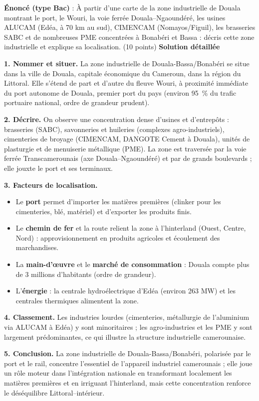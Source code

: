 \documentclass[11pt]{article}
\begin{document}
\begin{exoresolu}
\textbf{Énoncé (type Bac)} : À partir d'une carte de la zone industrielle de Douala montrant le port, le Wouri, la voie ferrée Douala--Ngaoundéré, les usines ALUCAM (Edéa, à 70 km au sud), CIMENCAM (Nomayos/Figuil), les brasseries SABC et de nombreuses PME concentrées à Bonabéri et Bassa : décris cette zone industrielle et explique sa localisation. (10 points)
\tcblower
\textbf{Solution détaillée}

\textbf{1. Nommer et situer.} La zone industrielle de Douala-Bassa/Bonabéri se situe dans la ville de Douala, capitale économique du Cameroun, dans la région du Littoral. Elle s'étend de part et d'autre du fleuve Wouri, à proximité immédiate du port autonome de Douala, premier port du pays (environ 95~\% du trafic portuaire national, ordre de grandeur prudent).

\textbf{2. Décrire.} On observe une concentration dense d'usines et d'entrepôts : brasseries (SABC), savonneries et huileries (complexes agro-industriels), cimenteries de broyage (CIMENCAM, DANGOTE Cement à Douala), unités de plasturgie et de menuiserie métallique (PME). La zone est traversée par la voie ferrée Transcamerounais (axe Douala--Ngaoundéré) et par de grands boulevards ; elle jouxte le port et ses terminaux.

\textbf{3. Facteurs de localisation.}
\begin{itemize}
\item Le \textbf{port} permet d'importer les matières premières (clinker pour les cimenteries, blé, matériel) et d'exporter les produits finis.
\item Le \textbf{chemin de fer} et la route relient la zone à l'hinterland (Ouest, Centre, Nord) : approvisionnement en produits agricoles et écoulement des marchandises.
\item La \textbf{main-d'œuvre} et le \textbf{marché de consommation} : Douala compte plus de 3 millions d'habitants (ordre de grandeur).
\item L'\textbf{énergie} : la centrale hydroélectrique d'Edéa (environ 263 MW) et les centrales thermiques alimentent la zone.
\end{itemize}

\textbf{4. Classement.} Les industries lourdes (cimenteries, métallurgie de l'aluminium via ALUCAM à Edéa) y sont minoritaires ; les agro-industries et les PME y sont largement prédominantes, ce qui illustre la structure industrielle camerounaise.

\textbf{5. Conclusion.} La zone industrielle de Douala-Bassa/Bonabéri, polarisée par le port et le rail, concentre l'essentiel de l'appareil industriel camerounais ; elle joue un rôle moteur dans l'intégration nationale en transformant localement les matières premières et en irriguant l'hinterland, mais cette concentration renforce le déséquilibre Littoral--intérieur.
\end{exoresolu}
\end{document}
